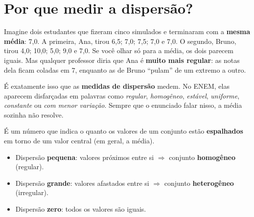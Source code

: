 
\section{Por que medir a dispersão?}

Imagine dois estudantes que fizeram cinco simulados e terminaram com a \textbf{mesma média}: 7,0.
A primeira, Ana, tirou 6,5; 7,0; 7,5; 7,0 e 7,0. O segundo, Bruno, tirou 4,0; 10,0; 5,0; 9,0 e 7,0.
Se você olhar só para a média, os dois parecem iguais. Mas qualquer professor diria que Ana é
\textbf{muito mais regular}: as notas dela ficam coladas em 7, enquanto as de Bruno “pulam” de um
extremo a outro.

\begin{center}
\end{center}

É exatamente isso que as \textbf{medidas de dispersão} medem. No ENEM, elas aparecem disfarçadas em
palavras como \emph{regular}, \emph{homogêneo}, \emph{estável}, \emph{uniforme}, \emph{constante} ou
\emph{com menor variação}. Sempre que o enunciado falar nisso, a média sozinha não resolve.

\begin{definicao}
É um número que indica o quanto os valores de um conjunto estão \textbf{espalhados} em torno de um
valor central (em geral, a média).
\begin{itemize}[nosep,leftmargin=1.2em]
  \item Dispersão \textbf{pequena}: valores próximos entre si $\Rightarrow$ conjunto \textbf{homogêneo} (regular).
  \item Dispersão \textbf{grande}: valores afastados entre si $\Rightarrow$ conjunto \textbf{heterogêneo} (irregular).
  \item Dispersão \textbf{zero}: todos os valores são iguais.
\end{itemize}
\end{definicao}

